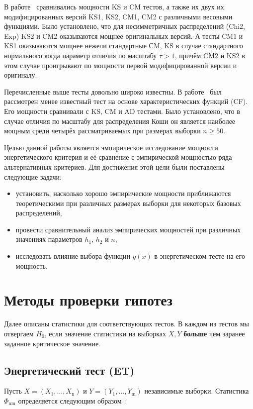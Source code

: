 \documentclass[12pt]{article}
\theoremstyle{break}
\begin{document}
В работе~\cite{KS_CM_article} сравнивались мощности KS и CM тестов, а также их двух их модифицированных версий KS1, KS2, CM1, CM2 с различными весовыми функциями. Было установлено, что для несимметричных распределений (Chi2, Exp) KS2 и CM2 оказываются мощнее оригинальных версий. А тесты CM1 и KS1 оказываются мощнее нежели стандартные СM, KS в случае стандартного нормального когда параметр отличия по масштабу $\tau > 1$, причём CM2 и KS2 в этом случае проигрывают по мощности первой модифицированной версии и оригиналу.

Перечисленные выше тесты довольно широко известны. В работе~\cite{cf_article} был рассмотрен менее известный тест на основе характеристических функций (CF). Его мощности сравнивали с KS, CM и AD тестами.
Было установлено, что в случае отличия по масштабу для распределения Коши он является наиболее мощным среди четырёх рассматриваемых при размерах выборки $n \geq 50$.

Целью данной работы является эмпирическое исследование мощности энергетического критерия и её сравнение с эмпирической мощностью ряда альтернативных критериев. Для достижения этой цели были поставлены следующие задачи:
\begin{itemize}
\item
установить, насколько хорошо эмпирические мощности приближаются теоретическими при различных размерах выборки для некоторых базовых распределений,
\item
провести сравнительный анализ эмпирических мощностей при различных значениях параметров $h_1$, $h_2$ и $n$,
\item
исследовать влияние выбора функции $g(x)$ в энергетическом тесте на его мощность.
\end{itemize}


\section{Методы проверки гипотез}

Далее описаны статистики для соответствующих тестов. В каждом из тестов мы отвергаем $H_0$, если значение статистики на выборках $X, Y$ \textbf{больше} чем заранее заданное критическое значение.

\subsection{Энергетический тест (ET) }
Пусть $X = (X_1, \ldots,X_{\mathrm{n}})$ и $Y = (Y_1, \ldots, Y_{\mathrm{m}})$ независимые выборки. Статистика $\Phi_{\mathrm{nm}}$ определяется следующим образом~\cite{ET_article}:
\end{document}
